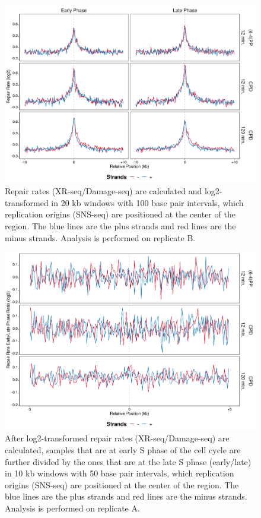 \begin{figure}[H]
\begin{center}
\includegraphics[width=\textwidth]{Chapters/7_appendix/figures/supfig53}
\caption[Repair rate of replication origins in 20 kb (replicate B).]{Repair rates (XR-seq/Damage-seq) are calculated and log2-transformed in 20 kb windows with 100 base pair intervals, which replication origins (SNS-seq) are positioned at the center of the region. The blue lines are the plus strands and red lines are the minus strands. Analysis is performed on replicate B.}
\label{supfig:rr20snsB}
\end{center}
\end{figure}

\begin{figure}[H]
\begin{center}
\includegraphics[width=\textwidth]{Chapters/7_appendix/figures/supfig54}
\caption[Repair rate early/late ratio of replication origins in 10 kb (replicate A).]{After log2-transformed repair rates (XR-seq/Damage-seq) are calculated, samples that are at early S phase of the cell cycle are further divided by the ones that are at the late S phase (early/late) in 10 kb windows with 50 base pair intervals, which replication origins (SNS-seq) are positioned at the center of the region. The blue lines are the plus strands and red lines are the minus strands. Analysis is performed on replicate A.}
\label{supfig:rrel10snsA}
\end{center}
\end{figure}

